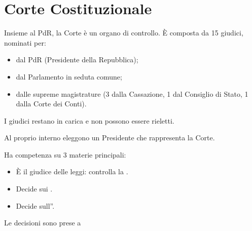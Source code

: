 \documentclass[letterpaper,10pt,italian]{sphinxmanual}
\begin{document}
\sphinxstepscope


\chapter{Corte Costituzionale}
\label{\detokenize{Corte Costituzionale:corte-costituzionale}}\label{\detokenize{Corte Costituzionale::doc}}
\sphinxAtStartPar
Insieme al PdR, la Corte è un organo di controllo.
È composta da 15 giudici, nominati per:
\begin{itemize}
\item {} 
\sphinxAtStartPar
{} dal PdR (Presidente della Repubblica);

\item {} 
\sphinxAtStartPar
{} dal Parlamento in seduta comune;

\item {} 
\sphinxAtStartPar
{} dalle supreme magistrature (3 dalla Cassazione, 1 dal Consiglio di Stato, 1 dalla Corte dei Conti).

\end{itemize}

\sphinxAtStartPar
{}

\sphinxAtStartPar
I giudici restano in carica  e non possono essere rieletti.

\sphinxAtStartPar
Al proprio interno eleggono un Presidente che rappresenta la Corte.

\sphinxAtStartPar
{}

\sphinxAtStartPar
Ha competenza su 3 materie principali:
\begin{itemize}
\item {} 
\sphinxAtStartPar
È il giudice delle leggi: controlla la .

\item {} 
\sphinxAtStartPar
Decide sui .

\item {} 
\sphinxAtStartPar
Decide sull”.

\end{itemize}

\sphinxAtStartPar
Le decisioni sono prese a 

\sphinxAtStartPar
{}
\end{document}
